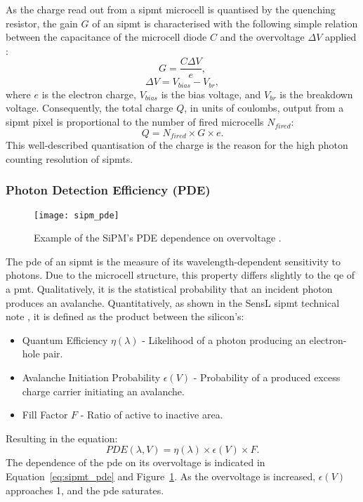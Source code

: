 As the charge read out from a \gls{sipmt} microcell is quantised by the quenching resistor, the gain $G$ of an \gls{sipmt} is characterised with the following simple relation between the capacitance of the microcell diode $C$ and the overvoltage $\Delta V$ applied \cite{SensL2011}:
\begin{equation} \label{eq:sipmt_gain}
G = \frac{C \Delta V}{e},
\end{equation}
\begin{equation} \label{eq:sipmt_voltage}
\Delta V = V_{bias} - V_{br},
\end{equation}
where $e$ is the electron charge, $V_{bias}$ is the bias voltage, and $V_{br}$ is the breakdown voltage. Consequently, the total charge $Q$, in units of coulombs, output from a \gls{sipmt} pixel is proportional to the number of fired microcells $N_{fired}$:
\begin{equation} \label{eq:sipmt_charge}
Q = N_{fired} \times G \times e.
\end{equation}
This well-described quantisation of the charge is the reason for the high photon counting resolution of \glspl{sipmt}.

\subsubsection{Photon Detection Efficiency (PDE)}

\begin{figure}
	\centering
    \texttt{[image: sipm\_pde]} 
	\caption[Example of the SiPM's PDE dependence on overvoltage.]{Example of the SiPM's PDE dependence on overvoltage \cite{SensL2011}.}
	\label{fig:sipm_pde}
\end{figure}

The \gls{pde} of an \gls{sipmt} is the measure of its wavelength-dependent sensitivity to photons. Due to the microcell structure, this property differs slightly to the \gls{qe} of a \gls{pmt}. Qualitatively, it is the statistical probability that an incident photon produces an avalanche. Quantitatively, as shown in the SensL \gls{sipmt} technical note \cite{SensL2011}, it is defined as the product between the silicon's:
\begin{itemize}
\item Quantum Efficiency $\eta(\lambda)$ - Likelihood of a photon producing an electron-hole pair. 
\item Avalanche Initiation Probability $\epsilon(V)$ - Probability of a produced excess charge carrier initiating an avalanche.
\item Fill Factor $F$ - Ratio of active to inactive area.
\end{itemize}
Resulting in the equation:
\begin{equation} \label{eq:sipmt_pde}
PDE(\lambda, V) = \eta(\lambda) \times \epsilon(V) \times F.
\end{equation}
The dependence of the \gls{pde} on its overvoltage is indicated in Equation~\ref{eq:sipmt_pde} and Figure~\ref{fig:sipm_pde}. As the overvoltage is increased, $\epsilon(V)$ approaches 1, and the \gls{pde} saturates.

